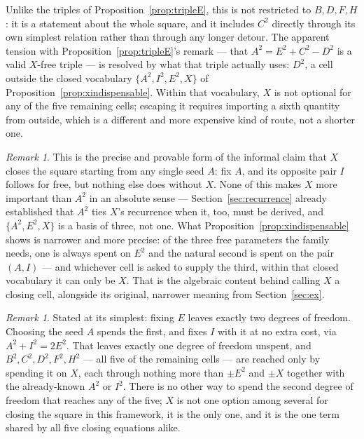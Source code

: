 \documentclass[12pt]{article}
\theoremstyle{remark}
\newtheorem{remark}[theorem]{Remark}
\begin{document}
Unlike the triples of Proposition~\ref{prop:tripleE}, this is not
restricted to $B,D,F,H$: it is a statement about the whole square,
and it includes $C^2$ directly through its own simplest relation
rather than through any longer detour. The apparent tension with
Proposition~\ref{prop:tripleE}'s remark --- that $A^2=E^2+C^2-D^2$ is
a valid $X$-free triple --- is resolved by what that triple actually
uses: $D^2$, a cell outside the closed vocabulary $\{A^2,I^2,E^2,X\}$
of Proposition~\ref{prop:xindispensable}. Within that vocabulary, $X$
is not optional for any of the five remaining cells; escaping it
requires importing a sixth quantity from outside, which is a different
and more expensive kind of route, not a shorter one.

\begin{remark}
This is the precise and provable form of the informal claim that $X$
closes the square starting from any single seed $A$: fix $A$, and its
opposite pair $I$ follows for free, but nothing else does without $X$.
None of this makes $X$ more important than $A^2$ in an absolute sense
--- Section~\ref{sec:recurrence} already established that $A^2$ ties
$X$'s recurrence when it, too, must be derived, and
$\{A^2,E^2,X\}$ is a basis of three, not one. What
Proposition~\ref{prop:xindispensable} shows is narrower and more
precise: of the three free parameters the family needs, one is always
spent on $E^2$ and the natural second is spent on the pair $(A,I)$
--- and whichever cell is asked to supply the third, within that
closed vocabulary it can only be $X$. That is the algebraic content
behind calling $X$ a closing cell, alongside its original, narrower
meaning from Section~\ref{sec:ex}.
\end{remark}

\begin{remark}
Stated at its simplest: fixing $E$ leaves exactly two degrees of
freedom. Choosing the seed $A$ spends the first, and fixes $I$ with it
at no extra cost, via $A^2+I^2=2E^2$. That leaves exactly one degree
of freedom unspent, and $B^2,C^2,D^2,F^2,H^2$ --- all five of the
remaining cells --- are reached only by spending it on $X$, each
through nothing more than $\pm E^2$ and $\pm X$ together with the
already-known $A^2$ or $I^2$. There is no other way to spend the
second degree of freedom that reaches any of the five; $X$ is not one
option among several for closing the square in this framework, it is
the only one, and it is the one term shared by all five closing
equations alike.
\end{remark}
\end{document}
